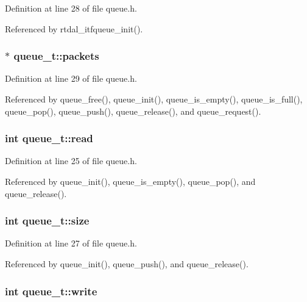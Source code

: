 Definition at line 28 of file queue.\-h.



Referenced by rtdal\-\_\-itfqueue\-\_\-init().

\subsubsection[{packets}]{$\ast$ queue\-\_\-t\-::packets}\label{structqueue__t_a4e7bd21c18e314d700a3f50211e56ad2}


Definition at line 29 of file queue.\-h.



Referenced by queue\-\_\-free(), queue\-\_\-init(), queue\-\_\-is\-\_\-empty(), queue\-\_\-is\-\_\-full(), queue\-\_\-pop(), queue\-\_\-push(), queue\-\_\-release(), and queue\-\_\-request().

\subsubsection[{read}]{\setlength{\rightskip}{0pt plus 5cm}int queue\-\_\-t\-::read}\label{structqueue__t_ab14b23120b93eec5582f901352e2e9d4}


Definition at line 25 of file queue.\-h.



Referenced by queue\-\_\-init(), queue\-\_\-is\-\_\-empty(), queue\-\_\-pop(), and queue\-\_\-release().

\subsubsection[{size}]{\setlength{\rightskip}{0pt plus 5cm}int queue\-\_\-t\-::size}\label{structqueue__t_aba421e67f2b95923bf43058d91c069ed}


Definition at line 27 of file queue.\-h.



Referenced by queue\-\_\-init(), queue\-\_\-push(), and queue\-\_\-release().

\subsubsection[{write}]{\setlength{\rightskip}{0pt plus 5cm}int queue\-\_\-t\-::write}\label{structqueue__t_aa9575621755ab4f79dcbcf49e599cd00}


